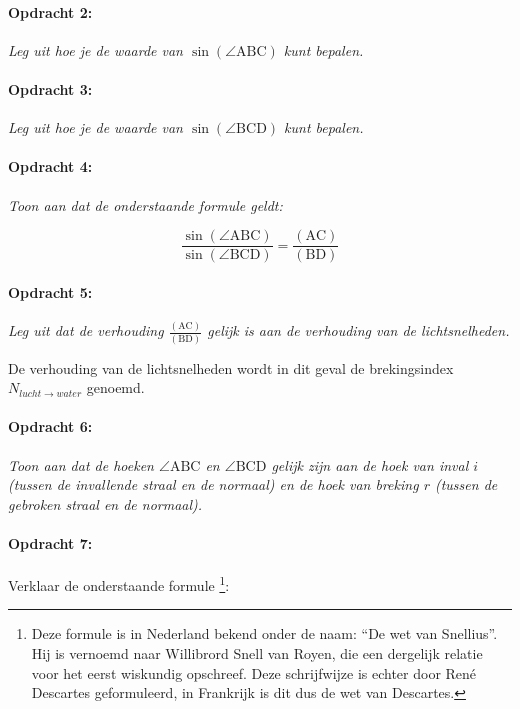 \paragraph*{Opdracht 2:}

\emph{Leg uit hoe je de waarde van $\sin(\angle\mathrm{ABC})$ kunt
bepalen.}


\paragraph*{Opdracht 3:}

\emph{Leg uit hoe je de waarde van $\sin(\angle\mathrm{BCD})$ kunt
bepalen.}


\paragraph*{Opdracht 4:}

\emph{Toon aan dat de onderstaande formule geldt:}

\[
\frac{\sin(\angle\mathrm{ABC})}{\sin(\angle\mathrm{BCD})}
=\frac{(\mathrm{AC})}{(\mathrm{BD})}
\]



\paragraph*{Opdracht 5:}

\emph{Leg uit dat de verhouding $\frac{(\mathrm{AC})}{(\mathrm{BD})}$
gelijk is aan de verhouding van de lichtsnelheden.}

De verhouding van de lichtsnelheden wordt in dit geval de brekingsindex
$N_{lucht\rightarrow water}$ genoemd.


\paragraph*{Opdracht 6:}

\emph{Toon aan dat de hoeken $\angle\mathrm{ABC}$ en $\angle\mathrm{BCD}$
gelijk zijn aan de hoek van inval $i$ (tussen de invallende straal
en de normaal) en de hoek van breking $r$ (tussen de gebroken straal
en de normaal).}


\paragraph*{Opdracht 7:}

Verklaar de onderstaande formule \footnote{Deze formule is in Nederland
bekend onder de naam: ``De wet van Snellius''. Hij is vernoemd naar
Willibrord Snell van Royen, die een dergelijk relatie voor het eerst
wiskundig opschreef. Deze schrijfwijze is echter door René Descartes
geformuleerd, in Frankrijk is dit dus de wet van Descartes.}:

